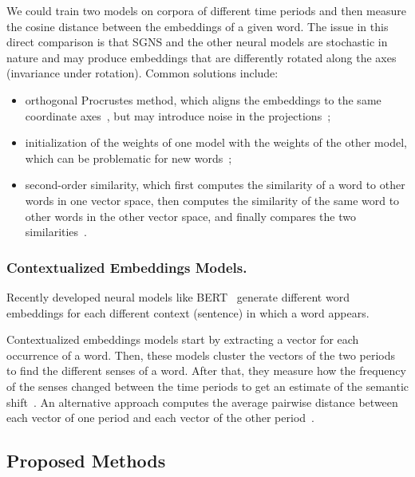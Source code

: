 \documentclass[runningheads]{llncs}
\begin{document}
We could train two models on corpora of different time periods and then measure the cosine distance between the embeddings of a given word. The issue in this direct comparison is that SGNS and the other neural models are stochastic in nature and may produce embeddings that are differently rotated along the axes (invariance under rotation). Common solutions include:

\begin{itemize}
    \item orthogonal Procrustes method, which aligns the embeddings to the same coordinate axes~\cite{hamilton-etal-2016-diachronic,prazak-etal-2020-uwb}, but may introduce noise in the projections~\cite{dubossarsky-etal-2019-time, zhou-li-2020-temporalteller};
    \item initialization of the weights of one model with the weights of the other model, which can be problematic for new words~\cite{kutuzov-etal-2018-diachronic,tahmasebi-etal-2018-survey};
    \item second-order similarity, which first computes the similarity of a word to other words in one vector space, then computes the similarity of the same word to other words in the other vector space, and finally compares the two similarities~\cite{kutuzov-etal-2018-diachronic,tahmasebi-etal-2018-survey}.   
\end{itemize}

\subsubsection{Contextualized Embeddings Models.} Recently developed neural models like BERT~\cite{devlin-etal-2018-bert} generate different word embeddings for each different context (sentence) in which a word appears. 

Contextualized embeddings models start by extracting a vector for each occurrence of a word. Then, these models cluster the vectors of the two periods to find the different senses of a word. After that, they measure how the frequency of the senses changed between the time periods to get an estimate of the semantic shift~\cite{giulianelli-etal-2020-analysing,rother-etal-2020-cmce}. An alternative approach computes the average pairwise distance between each vector of one period and each vector of the other period~\cite{laicher-etal-2021-explaining,pomsl-lyapin-2020-circe,kutuzov-giulianelli-2020-uio}.  
 

\subsection{Proposed Methods}
\label{subsec:semantic_shifts:methods}
\end{document}

